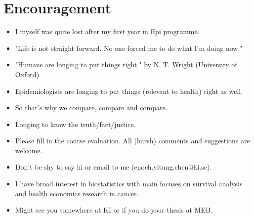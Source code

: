 \documentclass{beamer}
\begin{document}
\section{Encouragement}
\begin{frame}{\secname}
\begin{itemize}
	\item I myself was quite lost after my first year in Epi programme.
	\item "Life is not straight forward. No one forced me to do what I'm doing now."
\end{itemize}
\end{frame}

\begin{frame}{\secname}
\begin{itemize}
	\item "Humans are longing to put things right." by N. T. Wright (University of Oxford).
	\item Epidemiologists are longing to put things (relevant to health) right as well. 
	\item So that's why we compare, compare and compare. 
	\item Longing to know the truth/fact/justice.
\end{itemize}
\end{frame}

\begin{frame}{\secname}
\begin{itemize}
	\item Please fill in the course evaluation. All (harsh) comments and suggestions are welcome.
	\item Don't be shy to say hi or email to me (enoch.yitung.chen@ki.se). 
	\item I have broad interest in biostatistics with main focuses on survival analysis and health economics research in cancer.
	\item Might see you somewhere at KI or if you do your thesis at MEB.
\end{itemize}
\end{frame}
\end{document}
